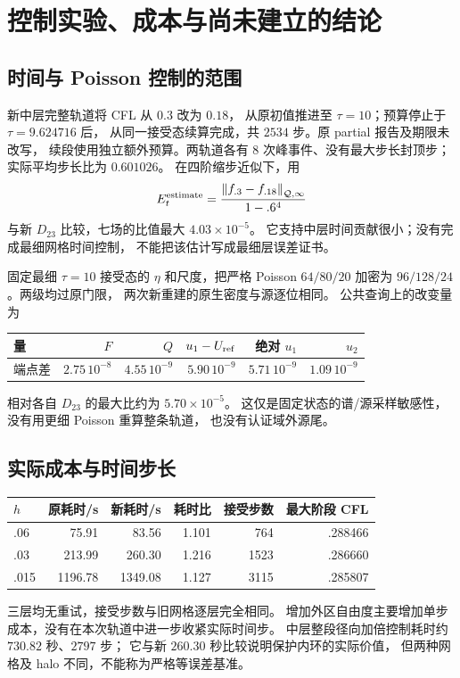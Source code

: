 \documentclass[UTF8,fontset=fandol,11pt,a4paper]{ctexart}
\newcommand{\norm}[1]{\left\lVert#1\right\rVert}
\begin{document}
\clearpage
\section{控制实验、成本与尚未建立的结论}
\subsection{时间与 Poisson 控制的范围}
新中层完整轨道将 CFL 从 $0.3$ 改为 $0.18$，
从原初值推进至 $\tau=10$；预算停止于 $\tau=9.624716$ 后，
从同一接受态续算完成，共 $2534$ 步。原 partial 报告及期限未改写，
续段使用独立额外预算。两轨道各有 $8$ 次峰事件、没有最大步长封顶步；
实际平均步长比为 $0.601026$。
在四阶缩步近似下，用
\begin{equation}
 E_t^{\rm estimate}=\frac{\norm{f_{.3}-f_{.18}}_{\mathcal Q,\infty}}
                           {1-.6^4}
\end{equation}
与新 $D_{23}$ 比较，七场的比值最大 $4.03\times10^{-5}$。
它支持中层时间贡献很小；没有完成最细网格时间控制，
不能把该估计写成最细层误差证书。

固定最细 $\tau=10$ 接受态的 $\eta$ 和尺度，把严格 Poisson
$64/80/20$ 加密为 $96/128/24$。两级均过原门限，
两次新重建的原生密度与源逐位相同。
公共查询上的改变量为
\begin{center}
\begin{tabular}{lrrrrr}
\toprule
量 & $F$ & $Q$ & $u_1-U_{\rm ref}$ & 绝对 $u_1$ & $u_2$\\
\midrule
端点差 & $2.75\,10^{-8}$ & $4.55\,10^{-9}$ & $5.90\,10^{-9}$ &
 $5.71\,10^{-9}$ & $1.09\,10^{-9}$\\
\bottomrule
\end{tabular}
\end{center}
相对各自 $D_{23}$ 的最大比约为 $5.70\times10^{-5}$。
这仅是固定状态的谱/源采样敏感性，没有用更细 Poisson 重算整条轨道，
也没有认证域外源尾。

\subsection{实际成本与时间步长}
\begin{center}
\begin{tabular}{lrrrrr}
\toprule
$h$ & 原耗时/s & 新耗时/s & 耗时比 & 接受步数 & 最大阶段 CFL\\
\midrule
.06 & 75.91 & 83.56 & 1.101 & 764 & .288466\\
.03 & 213.99 & 260.30 & 1.216 & 1523 & .286660\\
.015 & 1196.78 & 1349.08 & 1.127 & 3115 & .285807\\
\bottomrule
\end{tabular}
\end{center}
三层均无重试，接受步数与旧网格逐层完全相同。
增加外区自由度主要增加单步成本，没有在本次轨道中进一步收紧实际时间步。
中层整段径向加倍控制耗时约 $730.82$ 秒、$2797$ 步；
它与新 $260.30$ 秒比较说明保护内环的实际价值，
但两种网格及 halo 不同，不能称为严格等误差基准。
\end{document}
